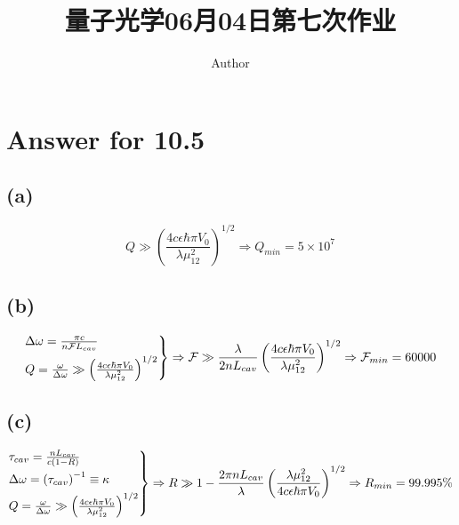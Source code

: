 \documentclass[twoside]{article}
\begin{document}
\title{量子光学06月04日第七次作业}
\author{Author}
\pagestyle{fancy}
\makeatletter
\fancyhead[L]{\@title}
\fancyhead[R]{\@author}
\makeatother
\setlength{\parindent}{0pt}



\section*{Answer for 10.5}

\subsection*{(a)}

\begin{equation}
    Q \gg \left(\frac{4 c \epsilon \hbar \pi V_0}{\lambda \mu_{12}^2}\right)^{1/2} \Rightarrow Q_{min} = 5 \times 10^{7}
\end{equation}

\subsection*{(b)}

\begin{equation}
    \begin{rcases}
        \Delta \omega = \frac{\pi c}{n\mathcal{F} L_{cav}} \\
        Q = \frac{\omega}{\Delta \omega} \gg \left(\frac{4 c \epsilon \hbar \pi V_0}{\lambda \mu_{12}^2}\right)^{1/2}
    \end{rcases}
    \Rightarrow
    \mathcal{F} \gg \frac{\lambda}{2 n L_{cav}}\left(\frac{4 c \epsilon \hbar \pi V_0}{\lambda \mu_{12}^2}\right)^{1/2}
    \Rightarrow
    \mathcal{F}_{min} = 60000
\end{equation}

\subsection*{(c)}

\begin{equation}
    \begin{rcases}
        \tau_{cav} = \frac{nL_{cav}}{c\left(1-R\right)}            \\
        \Delta \omega = \left(\tau_{cav}\right)^{-1} \equiv \kappa \\
        Q = \frac{\omega}{\Delta \omega} \gg \left(\frac{4 c \epsilon \hbar \pi V_0}{\lambda \mu_{12}^2}\right)^{1/2}
    \end{rcases}
    \Rightarrow
    R \gg  1 - \frac{2\pi n L_{cav}}{\lambda} \left(\frac{\lambda \mu_{12}^2}{4 c \epsilon \hbar \pi V_0}\right)^{1/2}
    \Rightarrow
    R_{min} = 99.995\%
\end{equation}
\end{document}
